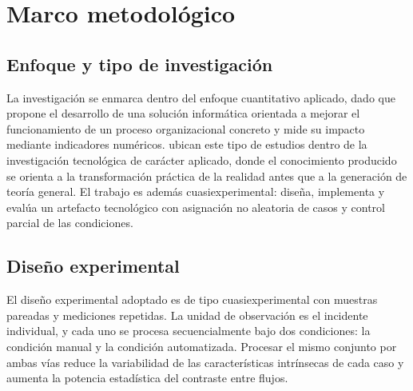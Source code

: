 \section{Marco metodológico}\label{sec:marco-metodologico}

\subsection{Enfoque y tipo de investigación}\label{subsec:enfoque-investigacion}

La investigación se enmarca dentro del enfoque cuantitativo aplicado, dado que propone el desarrollo de una solución informática orientada a mejorar el funcionamiento de un proceso organizacional concreto y mide su impacto mediante indicadores numéricos. \textcite{HernandezSampieri2018_metodologia} ubican este tipo de estudios dentro de la investigación tecnológica de carácter aplicado, donde el conocimiento producido se orienta a la transformación práctica de la realidad antes que a la generación de teoría general. El trabajo es además cuasiexperimental: diseña, implementa y evalúa un artefacto tecnológico con asignación no aleatoria de casos y control parcial de las condiciones.

\subsection{Diseño experimental}\label{subsec:diseno-experimental}

El diseño experimental adoptado es de tipo cuasiexperimental con muestras pareadas y mediciones repetidas. La unidad de observación es el incidente individual, y cada uno se procesa secuencialmente bajo dos condiciones: la condición manual y la condición automatizada. Procesar el mismo conjunto por ambas vías reduce la variabilidad de las características intrínsecas de cada caso y aumenta la potencia estadística del contraste entre flujos.

